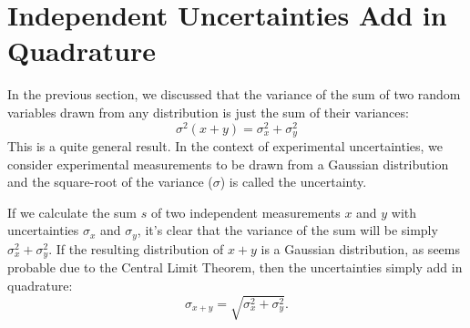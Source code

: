 \documentclass[12pt,oneside]{book}
\begin{document}
\chapter{Independent Uncertainties Add in Quadrature}

In the previous section, we discussed that the variance of the sum of
two random variables drawn from any distribution is just the sum of
their variances:
\begin{displaymath}
\sigma^2(x+y) = \sigma^2_x + \sigma^2_y
\end{displaymath}
This is a quite general result.  In the context of experimental
uncertainties, we consider experimental measurements to be drawn from
a Gaussian distribution and the square-root of the variance ($\sigma$)
is called the uncertainty.

If we calculate the sum $s$ of two independent measurements $x$ and
$y$ with uncertainties $\sigma_x$ and $\sigma_y$, it's clear that the
variance of the sum will be simply $\sigma^2_x + \sigma^2_y$.  If the
resulting distribution of $x+y$ is a Gaussian distribution, as seems
probable due to the Central Limit Theorem, then the uncertainties
simply add in quadrature:
\begin{displaymath}
\sigma_{x+y} = \sqrt{\sigma^2_x + \sigma^2_y}.
\end{displaymath}
\end{document}
